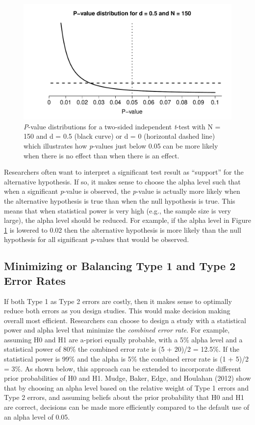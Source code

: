 \documentclass[,jou,floatsintext]{apa6}
\begin{document}
\begin{figure}
\centering
\includegraphics{Justify_in_Practice_files/figure-latex/p-plot-1.pdf}
\caption{\label{fig:p-plot}\emph{P}-value distributions for a two-sided independent \emph{t}-test with N = 150 and d = 0.5 (black curve) or d = 0 (horizontal dashed line) which illustrates how \emph{p}-values just below 0.05 can be more likely when there is no effect than when there is an effect.}
\end{figure}

Researchers often want to interpret a significant test result as \enquote{support} for the alternative hypothesis. If so, it makes sense to choose the alpha level such that when a significant \emph{p}-value is observed, the \emph{p}-value is actually more likely when the alternative hypothesis is true than when the null hypothesis is true. This means that when statistical power is very high (e.g., the sample size is very large), the alpha level should be reduced. For example, if the alpha level in Figure \ref{fig:p-plot} is lowered to 0.02 then the alternative hypothesis is more likely than the null hypothesis for all significant \emph{p}-values that would be observed.

\hypertarget{minimizing-or-balancing-type-1-and-type-2-error-rates}{%
\subsection{Minimizing or Balancing Type 1 and Type 2 Error Rates}\label{minimizing-or-balancing-type-1-and-type-2-error-rates}}

If both Type 1 as Type 2 errors are costly, then it makes sense to optimally reduce both errors as you design studies. This would make decision making overall most efficient. Researchers can choose to design a study with a statistical power and alpha level that minimize the \emph{combined error rate}. For example, assuming H0 and H1 are a-priori equally probable, with a 5\% alpha level and a statistical power of 80\% the combined error rate is (5 + 20)/2 = 12.5\%. If the statistical power is 99\% and the alpha is 5\% the combined error rate is (1 + 5)/2 = 3\%. As shown below, this approach can be extended to incorporate different prior probabilities of H0 and H1. Mudge, Baker, Edge, and Houlahan (2012) show that by choosing an alpha level based on the relative weight of Type 1 errors and Type 2 errors, and assuming beliefs about the prior probability that H0 and H1 are correct, decisions can be made more efficiently compared to the default use of an alpha level of 0.05.
\end{document}
